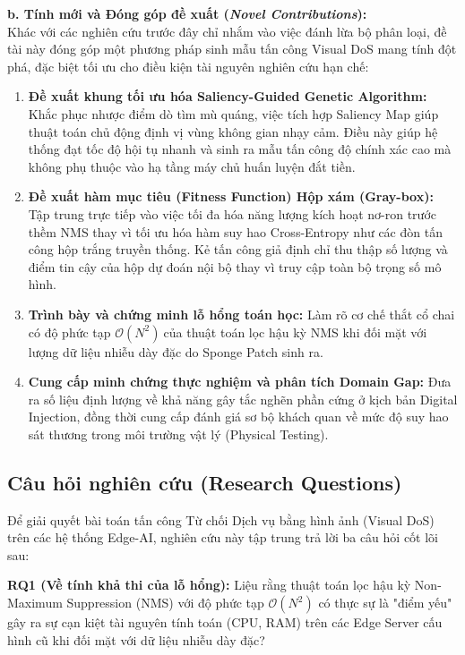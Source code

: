 \documentclass[a4paper,fleqn]{cas-dc}
\begin{document}
\textbf{b. Tính mới và Đóng góp đề xuất (\emph{Novel Contributions}):}\\
Khác với các nghiên cứu trước đây chỉ nhắm vào việc đánh lừa bộ phân
loại, đề tài này đóng góp một phương pháp sinh mẫu tấn công Visual DoS
mang tính đột phá, đặc biệt tối ưu cho điều kiện tài nguyên nghiên cứu
hạn chế:

\begin{enumerate}
\def\labelenumi{\arabic{enumi}.}
\item
  \textbf{Đề xuất khung tối ưu hóa Saliency-Guided Genetic Algorithm:}
  Khắc phục nhược điểm dò tìm mù quáng, việc tích hợp Saliency Map giúp
  thuật toán chủ động định vị vùng không gian nhạy cảm. Điều này giúp hệ
  thống đạt tốc độ hội tụ nhanh và sinh ra mẫu tấn công độ chính xác cao
  mà không phụ thuộc vào hạ tầng máy chủ huấn luyện đắt tiền.
\item
  \textbf{Đề xuất hàm mục tiêu (Fitness Function) Hộp xám (Gray-box):}
  Tập trung trực tiếp vào việc tối đa hóa năng lượng kích hoạt nơ-ron
  trước thềm NMS thay vì tối ưu hóa hàm suy hao Cross-Entropy như các
  đòn tấn công hộp trắng truyền thống. Kẻ tấn công giả định chỉ thu thập
  số lượng và điểm tin cậy của hộp dự đoán nội bộ thay vì truy cập toàn
  bộ trọng số mô hình.
\item
  \textbf{Trình bày và chứng minh lỗ hổng toán học:} Làm rõ cơ chế thắt
  cổ chai có độ phức tạp \(\mathcal{O}\left( N^{2} \right)\ \)của thuật
  toán lọc hậu kỳ NMS khi đối mặt với lượng dữ liệu nhiễu dày đặc do
  Sponge Patch sinh ra.
\item
  \textbf{Cung cấp minh chứng thực nghiệm và phân tích Domain Gap:} Đưa
  ra số liệu định lượng về khả năng gây tắc nghẽn phần cứng ở kịch bản
  Digital Injection, đồng thời cung cấp đánh giá sơ bộ khách quan về mức
  độ suy hao sát thương trong môi trường vật lý (Physical Testing).
\end{enumerate}

\subsection{Câu hỏi nghiên cứu (Research Questions)}



Để giải quyết bài toán tấn công Từ chối Dịch vụ bằng hình ảnh (Visual
DoS) trên các hệ thống Edge-AI, nghiên cứu này tập trung trả lời ba câu
hỏi cốt lõi sau:

\textbf{RQ1 (Về tính khả thi của lỗ hổng):} Liệu rằng thuật toán lọc hậu
kỳ Non-Maximum Suppression (NMS) với độ phức tạp
\(\mathcal{O}\left( N^{2} \right)\) có thực sự là "điểm yếu" gây ra sự
cạn kiệt tài nguyên tính toán (CPU, RAM) trên các Edge Server cấu hình
cũ khi đối mặt với dữ liệu nhiễu dày đặc?
\end{document}
